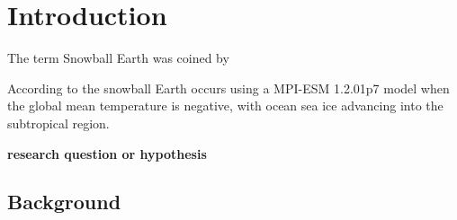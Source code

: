 \section{Introduction}
The term Snowball Earth was coined by \citet{Kirschvink1992}

According to \citet{Renoult2026} the snowball Earth occurs using a MPI-ESM 1.2.01p7 model when the global mean temperature is negative, with ocean sea ice advancing into the subtropical region.   

\textbf{research question or hypothesis}

\subsection{Background}

\citet{Fourier1824}